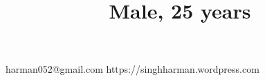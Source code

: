 \title{\normalsize Male, 25 years}

\address
    {H.No. 195, Street No. 3, Bachittar Nagar, Gill Road Ludhiana - 141006, Punjab, India}
\email
    {harman052@gmail.com}
\homepage
    {https://singhharman.wordpress.com}
